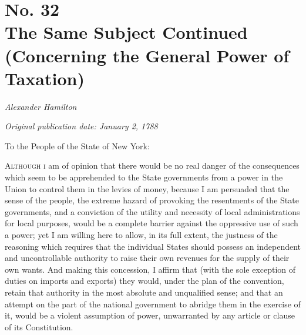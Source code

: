 \chapter[No. 32: The Same Subject Continued (Concerning the General Power of Taxation)]{No. 32\\ {\small The Same Subject Continued (Concerning the General Power of Taxation)}}

\textit{Alexander Hamilton}

\textit{Original publication date: January 2, 1788}
\vspace{1cm}

To the People of the State of New York:
\vspace{.4cm}

\textsc{Although i} am of opinion that there would be no real danger of the consequences which seem to be apprehended to the State governments from a power in the Union to control them in the levies of money, because I am persuaded that the sense of the people, the extreme hazard of provoking the resentments of the State governments, and a conviction of the utility and necessity of local administrations for local purposes, would be a complete barrier against the oppressive use of such a power; yet I am willing here to allow, in its full extent, the justness of the reasoning which requires that the individual States should possess an independent and uncontrollable authority to raise their own revenues for the supply of their own wants. 
And making this concession, I affirm that (with the sole exception of duties on imports and exports) they would, under the plan of the convention, retain that authority in the most absolute and unqualified sense; and that an attempt on the part of the national government to abridge them in the exercise of it, would be a violent assumption of power, unwarranted by any article or clause of its Constitution.

